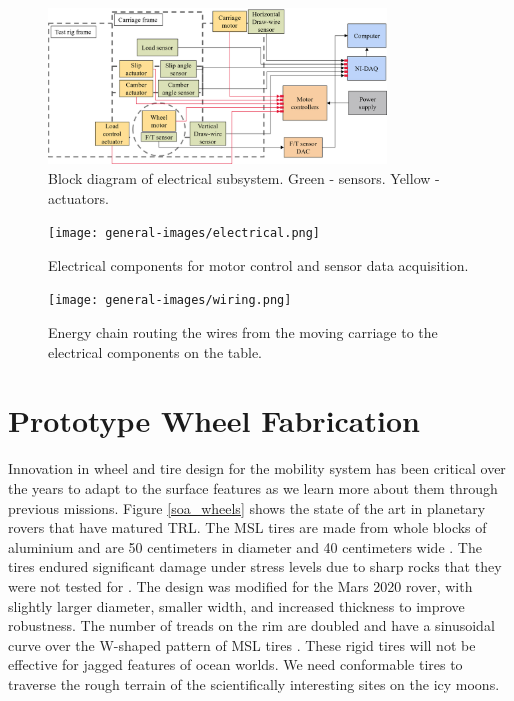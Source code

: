 \documentclass{article}
\begin{document}
\begin{figure}[hbt!]
\centering
\includegraphics[width=0.8\textwidth]{plots/electrical_components_diagram.PNG}
\caption{Block diagram of electrical subsystem. Green - sensors. Yellow - actuators.}
\label{fig:electrical-diagram}
\end{figure}

\begin{figure}[hbt!]
\centering
\texttt{[image: general-images/electrical.png]}
\caption{Electrical components for motor control and sensor data acquisition.}
\label{fig:electrical-components}
\end{figure}

\begin{figure}[hbt!]
\centering
\texttt{[image: general-images/wiring.png]}
\caption{Energy chain routing the wires from the moving carriage to the electrical components on the table.}
\label{fig:energychain}
\end{figure}


\section{Prototype Wheel Fabrication}
\label{sec:tire-prototyoe-fabrication}
Innovation in wheel and tire design for the mobility system has been critical over the years to adapt to the surface features as we learn more about them through previous missions. Figure \ref{soa_wheels} shows the state of the art in planetary rovers that have matured TRL. The MSL tires are made from whole blocks of aluminium and are 50 centimeters in diameter and 40 centimeters wide \cite{haggart2008mobility}. The tires endured significant damage under stress levels due to sharp rocks that they were not tested for \cite{toupet2018traction}. The design was modified for the Mars 2020 rover, with slightly larger diameter, smaller width, and increased thickness to improve robustness. The number of treads on the rim are doubled and have a sinusoidal curve over the W-shaped pattern of MSL tires \cite{inotsume2019parametric}. These rigid tires will not be effective for jagged features of ocean worlds. We need conformable tires to traverse the rough terrain of the scientifically interesting sites on the icy moons.
\end{document}
